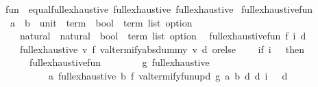 \begin{isabellebody}
\ {\isachardoublequoteopen}fun{\isachardoublequoteclose}\ {\isacharcolon}{\kern0pt}{\isacharcolon}{\kern0pt}\ {\isacharparenleft}{\kern0pt}{\isachardoublequoteopen}{\isacharbraceleft}{\kern0pt}equal{\isacharcomma}{\kern0pt}full{\isacharunderscore}{\kern0pt}exhaustive{\isacharbraceright}{\kern0pt}{\isachardoublequoteclose}{\isacharcomma}{\kern0pt}\ full{\isacharunderscore}{\kern0pt}exhaustive{\isacharparenright}{\kern0pt}\ full{\isacharunderscore}{\kern0pt}exhaustive\isanewline
{}\isanewline
\isanewline
{}\isamarkupfalse%
\ full{\isacharunderscore}{\kern0pt}exhaustive{\isacharunderscore}{\kern0pt}fun{\isacharprime}{\kern0pt}\ {\isacharcolon}{\kern0pt}{\isacharcolon}{\kern0pt}\isanewline
\ \ {\isachardoublequoteopen}{\isacharparenleft}{\kern0pt}{\isacharparenleft}{\kern0pt}{\isacharprime}{\kern0pt}a\ {\isasymRightarrow}\ {\isacharprime}{\kern0pt}b{\isacharparenright}{\kern0pt}\ {\isasymtimes}\ {\isacharparenleft}{\kern0pt}unit\ {\isasymRightarrow}\ term{\isacharparenright}{\kern0pt}\ {\isasymRightarrow}\ {\isacharparenleft}{\kern0pt}bool\ {\isasymtimes}\ term\ list{\isacharparenright}{\kern0pt}\ option{\isacharparenright}{\kern0pt}\ {\isasymRightarrow}\isanewline
\ \ \ \ natural\ {\isasymRightarrow}\ natural\ {\isasymRightarrow}\ {\isacharparenleft}{\kern0pt}bool\ {\isasymtimes}\ term\ list{\isacharparenright}{\kern0pt}\ option{\isachardoublequoteclose}\isanewline
{}\isanewline
\ \ {\isachardoublequoteopen}full{\isacharunderscore}{\kern0pt}exhaustive{\isacharunderscore}{\kern0pt}fun{\isacharprime}{\kern0pt}\ f\ i\ d\ {\isacharequal}{\kern0pt}\isanewline
\ \ \ \ full{\isacharunderscore}{\kern0pt}exhaustive\ {\isacharparenleft}{\kern0pt}{\isasymlambda}v{\isachardot}{\kern0pt}\ f\ {\isacharparenleft}{\kern0pt}valtermify{\isacharunderscore}{\kern0pt}absdummy\ v{\isacharparenright}{\kern0pt}{\isacharparenright}{\kern0pt}\ d\ orelse\isanewline
\ \ \ \ {\isacharparenleft}{\kern0pt}if\ i\ {\isachargreater}{\kern0pt}\ {}\ then\isanewline
\ \ \ \ \ \ full{\isacharunderscore}{\kern0pt}exhaustive{\isacharunderscore}{\kern0pt}fun{\isacharprime}{\kern0pt}\isanewline
\ \ \ \ \ \ \ \ {\isacharparenleft}{\kern0pt}{\isasymlambda}g{\isachardot}{\kern0pt}\ full{\isacharunderscore}{\kern0pt}exhaustive\isanewline
\ \ \ \ \ \ \ \ \ \ {\isacharparenleft}{\kern0pt}{\isasymlambda}a{\isachardot}{\kern0pt}\ full{\isacharunderscore}{\kern0pt}exhaustive\ {\isacharparenleft}{\kern0pt}{\isasymlambda}b{\isachardot}{\kern0pt}\ f\ {\isacharparenleft}{\kern0pt}valtermify{\isacharunderscore}{\kern0pt}fun{\isacharunderscore}{\kern0pt}upd\ g\ a\ b{\isacharparenright}{\kern0pt}{\isacharparenright}{\kern0pt}\ d{\isacharparenright}{\kern0pt}\ d{\isacharparenright}{\kern0pt}\ {\isacharparenleft}{\kern0pt}i\ {\isacharminus}{\kern0pt}\ {}{\isacharparenright}{\kern0pt}\ d\isanewline

\end{isabellebody}
